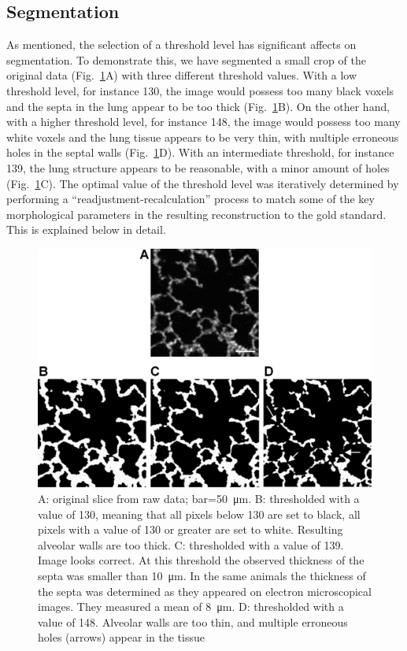 \subsection{Segmentation}
As mentioned, the selection of a threshold level has significant affects on segmentation. To demonstrate this, we have segmented a small crop of the original data (Fig.~\ref{fig:segmentation}A) with three different threshold values. With a low threshold level, for instance 130, the image would possess too many black voxels and the septa in the lung appear to be too thick (Fig.~\ref{fig:segmentation}B). On the other hand, with a higher threshold level, for instance 148, the image would possess too many white voxels and the lung tissue appears to be very thin, with multiple erroneous holes in the septal walls (Fig.~\ref{fig:segmentation}D). With an intermediate threshold, for instance 139, the lung structure appears to be reasonable, with a minor amount of holes (Fig.~\ref{fig:segmentation}C). The optimal value of the threshold level was iteratively determined by performing a ``readjustment-recalculation'' process to match some of the key morphological parameters in the resulting \threed reconstruction to the gold standard. This is explained below in detail.

\begin{figure}[htb]
	\centering
	\includegraphics[width=\imsize]{img/Tsuda2008/Tsuda-06}
	\caption[Thresholding Influence]{A: original slice from raw data; bar=\SI{50}{\micro\meter}. B: thresholded with a value of 130, meaning that all pixels below 130 are set to black, all pixels with a value of 130 or greater are set to white. Resulting alveolar walls are too thick. C: thresholded with a value of 139. Image looks correct. At this
threshold the observed thickness of the septa was smaller than \SI{10}{\micro\meter}. In the same animals \cite{Roth2005} the thickness of the septa was determined as they appeared on electron microscopical images. They measured a mean of \SI{8}{\micro\meter}. D: thresholded with a value of 148. Alveolar walls are too thin, and multiple erroneous holes (arrows) appear in the tissue}
	\label{fig:segmentation}
\end{figure}

